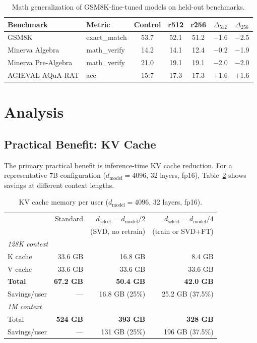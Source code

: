 \documentclass{article} %
\newcommand{\dmodel}{d_{\text{model}}}
\newcommand{\dselect}{d_{\text{select}}}
\begin{document}
\begin{table}[h]
\centering
\caption{Math generalization of GSM8K-fine-tuned models on held-out benchmarks.}
\label{tab:math_generalization}
\begin{tabular}{llccccc}
\toprule
Benchmark & Metric & Control & r512 & r256 & $\Delta_{512}$ & $\Delta_{256}$ \\
\midrule
GSM8K & exact\_match & 53.7 & 52.1 & 51.2 & $-$1.6 & $-$2.5 \\
Minerva Algebra & math\_verify & 14.2 & 14.1 & 12.4 & $-$0.2 & $-$1.9 \\
Minerva Pre-Algebra & math\_verify & 21.0 & 19.1 & 19.1 & $-$2.0 & $-$2.0 \\
AGIEVAL AQuA-RAT & acc & 15.7 & 17.3 & 17.3 & $+$1.6 & $+$1.6 \\
\bottomrule
\end{tabular}
\end{table}


\section{Analysis}

\subsection{Practical Benefit: KV Cache}

The primary practical benefit is inference-time KV cache reduction. For a representative 7B configuration ($\dmodel = 4096$, 32 layers, fp16), Table~\ref{tab:kvcache} shows savings at different context lengths.

\begin{table}[h]
\centering
\caption{KV cache memory per user ($\dmodel = 4096$, 32 layers, fp16).}
\label{tab:kvcache}
\begin{tabular}{lrrr}
\toprule
 & Standard & $\dselect = \dmodel/2$ & $\dselect = \dmodel/4$ \\
 & & (SVD, no retrain) & (train or SVD+FT) \\
\midrule
\multicolumn{4}{l}{\emph{128K context}} \\
\quad K cache & 33.6 GB & 16.8 GB & 8.4 GB \\
\quad V cache & 33.6 GB & 33.6 GB & 33.6 GB \\
\quad \textbf{Total} & \textbf{67.2 GB} & \textbf{50.4 GB} & \textbf{42.0 GB} \\
\quad Savings/user & --- & 16.8 GB (25\%) & 25.2 GB (37.5\%) \\
\midrule
\multicolumn{4}{l}{\emph{1M context}} \\
\quad Total & \textbf{524 GB} & \textbf{393 GB} & \textbf{328 GB} \\
\quad Savings/user & --- & 131 GB (25\%) & 196 GB (37.5\%) \\
\bottomrule
\end{tabular}
\end{table}
\end{document}
